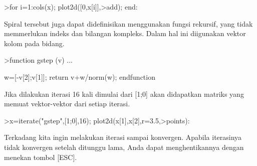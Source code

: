 \documentclass[12pt,Times new roman,letterpaper]{book}
\begin{document}
\begin{eulernootebook}
\begin{eulercomment}
\begin{eulercomment}
\begin{eulernootebook}
\begin{eulercomment}
\begin{eulercomment}
\begin{eulercomment}
\begin{eulercomment}
\begin{eulercomment}
\begin{eulercomment}
\begin{eulernotebook}
\begin{eulercomment}
\begin{eulercomment}
\begin{eulercomment}
\begin{eulercomment}
\begin{eulercomment}
\begin{eulercomment}
\begin{eulercomment}
\begin{eulercomment}
\begin{eulercomment}
\begin{eulercomment}
\begin{eulercomment}
\begin{eulercomment}
\begin{eulercomment}
\begin{eulercomment}
\begin{eulercomment}
\begin{eulercomment}
\begin{eulercomment}
\begin{eulercomment}
\begin{eulercomment}
\begin{eulercomment}
\begin{eulercomment}
\begin{eulercomment}
\begin{eulercomment}
\begin{eulercomment}
\begin{eulercomment}
\begin{eulercomment}
\begin{eulercomment}
\begin{eulercomment}
\begin{eulerprompt}
>for i=1:cols(x); plot2d([0,x[i]],>add); end:
\end{eulerprompt}
\begin{eulercomment}
Spiral tersebut juga dapat didefinisikan menggunakan fungsi rekursif,
yang tidak memmerlukan indeks dan bilangan kompleks. Dalam hal ini
diigunakan vektor kolom pada bidang.
\end{eulercomment}
\begin{eulerprompt}
>function gstep (v) ...
\end{eulerprompt}
\begin{eulerudf}
  w=[-v[2];v[1]];
  return v+w/norm(w);
  endfunction
\end{eulerudf}
\begin{eulercomment}
Jika dilakukan iterasi 16 kali dimulai dari [1;0] akan didapatkan
matriks yang memuat vektor-vektor dari setiap iterasi.
\end{eulercomment}
\begin{eulerprompt}
>x=iterate("gstep",[1;0],16); plot2d(x[1],x[2],r=3.5,>points):
\end{eulerprompt}
\begin{eulercomment}
\begin{eulercomment}
\begin{eulercomment}
Terkadang kita ingin melakukan iterasi sampai konvergen. Apabila
iterasinya tidak konvergen setelah ditunggu lama, Anda dapat
menghentikannya dengan menekan tombol [ESC].

\end{eulercomment}
\end{eulercomment}
\end{eulercomment}
\end{eulercomment}
\end{eulercomment}
\end{eulercomment}
\end{eulercomment}
\end{eulercomment}
\end{eulercomment}
\end{eulercomment}
\end{eulercomment}
\end{eulercomment}
\end{eulercomment}
\end{eulercomment}
\end{eulercomment}
\end{eulercomment}
\end{eulercomment}
\end{eulercomment}
\end{eulercomment}
\end{eulercomment}
\end{eulercomment}
\end{eulercomment}
\end{eulercomment}
\end{eulercomment}
\end{eulercomment}
\end{eulercomment}
\end{eulercomment}
\end{eulercomment}
\end{eulercomment}
\end{eulercomment}
\end{eulercomment}
\end{eulernotebook}
\end{eulercomment}
\end{eulercomment}
\end{eulercomment}
\end{eulercomment}
\end{eulercomment}
\end{eulercomment}
\end{eulernootebook}
\end{eulercomment}
\end{eulercomment}
\end{eulernootebook}
\end{document}
